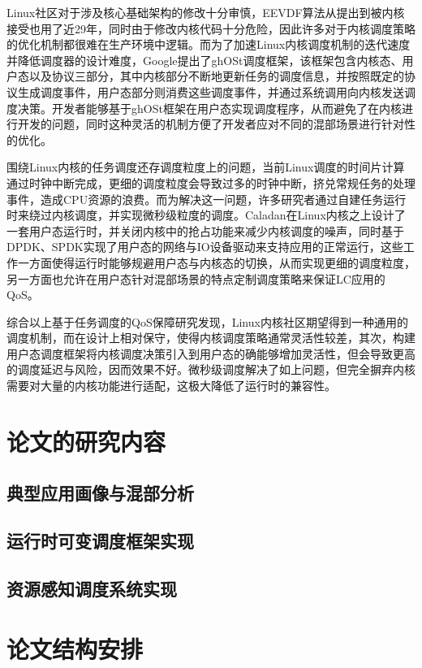 Linux社区对于涉及核心基础架构的修改十分审慎，EEVDF算法从提出到被内核接受也用了近29年，同时由于修改内核代码十分危险，因此许多对于内核调度策略的优化机制都很难在生产环境中逻辑。而为了加速Linux内核调度机制的迭代速度并降低调度器的设计难度，Google提出了ghOSt\citep{humphries2021ghost}调度框架，该框架包含内核态、用户态以及协议三部分，其中内核部分不断地更新任务的调度信息，并按照既定的协议生成调度事件，用户态部分则消费这些调度事件，并通过系统调用向内核发送调度决策。开发者能够基于ghOSt框架在用户态实现调度程序，从而避免了在内核进行开发的问题，同时这种灵活的机制方便了开发者应对不同的混部场景进行针对性的优化。

围绕Linux内核的任务调度还存调度粒度上的问题，当前Linux调度的时间片计算通过时钟中断完成，更细的调度粒度会导致过多的时钟中断，挤兑常规任务的处理事件，造成CPU资源的浪费。而为解决这一问题，许多研究者通过自建任务运行时来绕过内核调度，并实现微秒级粒度的调度\citep{yang2016elfen,ousterhout2019shenango,fried2020caladan,prekas2017zygos}。Caladan\citep{fried2020caladan}在Linux内核之上设计了一套用户态运行时，并关闭内核中的抢占功能来减少内核调度的噪声，同时基于DPDK、SPDK实现了用户态的网络与IO设备驱动来支持应用的正常运行，这些工作一方面使得运行时能够规避用户态与内核态的切换，从而实现更细的调度粒度，另一方面也允许在用户态针对混部场景的特点定制调度策略来保证LC应用的QoS。

综合以上基于任务调度的QoS保障研究发现，Linux内核社区期望得到一种通用的调度机制，而在设计上相对保守，使得内核调度策略通常灵活性较差，其次，构建用户态调度框架将内核调度决策引入到用户态的确能够增加灵活性，但会导致更高的调度延迟与风险，因而效果不好。微秒级调度解决了如上问题，但完全摒弃内核需要对大量的内核功能进行适配，这极大降低了运行时的兼容性。

\section{论文的研究内容}

\subsection{典型应用画像与混部分析}

\subsection{运行时可变调度框架实现}

\subsection{资源感知调度系统实现}

\section{论文结构安排}
